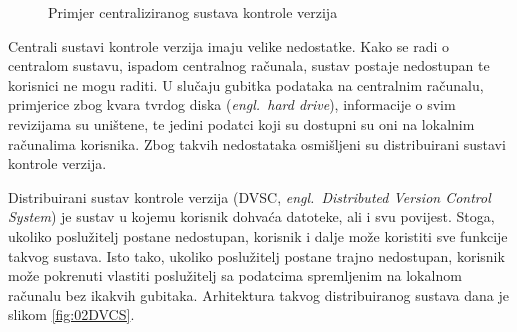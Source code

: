 \begin{figure}[h]

    \caption{Primjer centraliziranog sustava kontrole verzija}%
    \label{fig:02CVCS}
\end{figure}

Centrali sustavi kontrole verzija imaju velike nedostatke. Kako se radi o centralom sustavu, ispadom
centralnog računala, sustav postaje nedostupan te korisnici ne mogu raditi. U slučaju gubitka
podataka na centralnim računalu, primjerice zbog kvara tvrdog diska (\textit{engl.~hard drive}),
informacije o svim revizijama su uništene, te jedini podatci koji su dostupni su oni na lokalnim
računalima korisnika. Zbog takvih nedostataka osmišljeni su distribuirani sustavi kontrole verzija.

Distribuirani sustav kontrole verzija (DVSC, \textit{engl.~Distributed Version Control System}) je
sustav u kojemu korisnik dohvaća datoteke, ali i svu povijest. Stoga, ukoliko poslužitelj postane
nedostupan, korisnik i dalje može koristiti sve funkcije takvog sustava. Isto tako, ukoliko
poslužitelj postane trajno nedostupan, korisnik može pokrenuti vlastiti poslužitelj sa podatcima
spremljenim na lokalnom računalu bez ikakvih gubitaka. Arhitektura takvog distribuiranog sustava
dana je slikom \ref{fig:02DVCS}.

